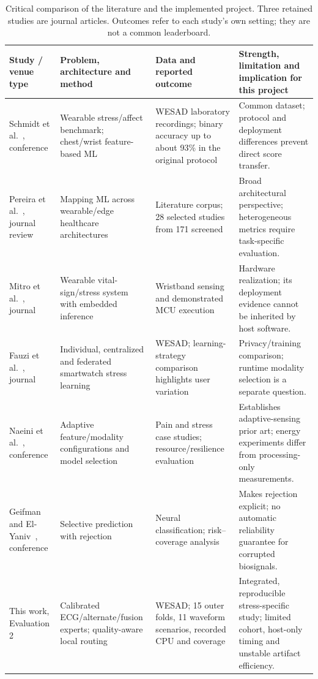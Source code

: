 \documentclass[conference,a4paper]{IEEEtran}
\newcommand{\pct}{\%}
\begin{document}
\begin{table}[t]
\centering\small
\caption{Critical comparison of the literature and the implemented project. Three retained studies are journal articles. Outcomes refer to each study's own setting; they are not a common leaderboard.}
\label{tab:literature}
\begin{tabularx}{\textwidth}{P{2.15cm}P{2.8cm}P{3.0cm}Y}\toprule
Study / venue type & Problem, architecture and method & Data and reported outcome & Strength, limitation and implication for this project\\\midrule
Schmidt et al.~\cite{schmidt2018}, conference & Wearable stress/affect benchmark; chest/wrist feature-based ML & WESAD laboratory recordings; binary accuracy up to about 93\pct{} in the original protocol & Common dataset; protocol and deployment differences prevent direct score transfer.\\
Pereira et al.~\cite{pereira2024}, journal review & Mapping ML across wearable/edge healthcare architectures & Literature corpus; 28 selected studies from 171 screened & Broad architectural perspective; heterogeneous metrics require task-specific evaluation.\\
Mitro et al.~\cite{mitro2023}, journal & Wearable vital-sign/stress system with embedded inference & Wristband sensing and demonstrated MCU execution & Hardware realization; its deployment evidence cannot be inherited by host software.\\
Fauzi et al.~\cite{fauzi2022}, journal & Individual, centralized and federated smartwatch stress learning & WESAD; learning-strategy comparison highlights user variation & Privacy/training comparison; runtime modality selection is a separate question.\\
Naeini et al.~\cite{amser2022}, conference & Adaptive feature/modality configurations and model selection & Pain and stress case studies; resource/resilience evaluation & Establishes adaptive-sensing prior art; energy experiments differ from processing-only measurements.\\
Geifman and El-Yaniv~\cite{geifman2017}, conference & Selective prediction with rejection & Neural classification; risk--coverage analysis & Makes rejection explicit; no automatic reliability guarantee for corrupted biosignals.\\
This work, Evaluation 2 & Calibrated ECG/alternate/fusion experts; quality-aware local routing & WESAD; 15 outer folds, 11 waveform scenarios, recorded CPU and coverage & Integrated, reproducible stress-specific study; limited cohort, host-only timing and unstable artifact efficiency.\\\bottomrule
\end{tabularx}
\end{table}
\end{document}
